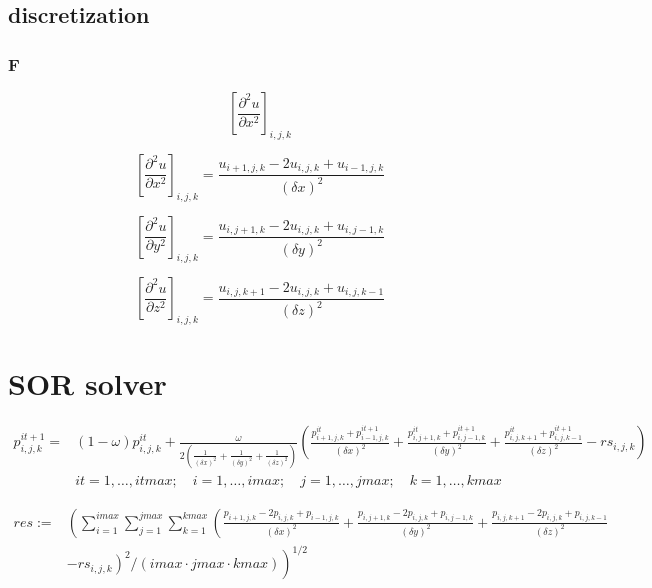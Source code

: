 \documentclass[10pt]{article}
\begin{document}
\subsection{discretization}
\subsubsection{F}

\begin{equation}
\left[\frac{\partial^2 u}{\partial x^2}\right]_{i,j,k}
\end{equation}

\begin{equation}
\left[\frac{\partial^2 u}{\partial x^2}\right]_{i,j,k} =
\frac{u_{i+1,j,k} - 2u_{i,j,k} + u_{i-1,j,k}}{(\delta x)^2}
\end{equation}

\begin{equation}
\left[\frac{\partial^2 u}{\partial y^2}\right]_{i,j,k} =
\frac{u_{i,j+1,k} - 2u_{i,j,k} + u_{i,j-1,k}}{(\delta y)^2}
\end{equation}

\begin{equation}
\left[\frac{\partial^2 u}{\partial z^2}\right]_{i,j,k} =
\frac{u_{i,j,k+1} - 2u_{i,j,k} + u_{i,j,k-1}}{(\delta z)^2}
\end{equation}


\section{SOR solver}
\begin{equation}
\begin{split}
p^{it+1}_{i,j,k} = & (1 - \omega) p^{it}_{i,j,k} + \frac{\omega}{2 (\frac{1}{(\delta x)^2} + \frac{1}{(\delta y)^2} + \frac{1}{(\delta z)^2})} \left( \frac{p^{it}_{i+1,j,k} + p^{it+1}_{i-1,j,k}}{(\delta x)^2} + \frac{p^{it}_{i,j+1,k} + p^{it+1}_{i,j-1,k}}{(\delta y)^2} + \frac{p^{it}_{i,j,k+1} + p^{it+1}_{i,j,k-1}}{(\delta z)^2} - rs_{i,j,k} \right)\\
& it = 1,\ldots,itmax; \quad i = 1,\ldots,imax; \quad j = 1,\ldots,jmax; \quad k = 1,\ldots,kmax
\end{split}
\end{equation}

\begin{equation}
\begin{split}
res := & \left( \sum_{i=1}^{imax} \sum_{j=1}^{jmax} \sum_{k=1}^{kmax} \left( \frac{p_{i+1,j,k} - 2 p_{i,j,k} + p_{i-1,j,k}}{(\delta x)^2} + \frac{p_{i,j+1,k} - 2 p_{i,j,k} + p_{i,j-1,k}}{(\delta y)^2} + \frac{p_{i,j,k+1} - 2 p_{i,j,k} + p_{i,j,k-1}}{(\delta z)^2} \right. \right. \\
& \left. \left. - rs_{i,j,k} \right)^2 / (imax \cdot jmax \cdot kmax) \right)^{1/2}
\end{split}
\end{equation}
\end{document}
